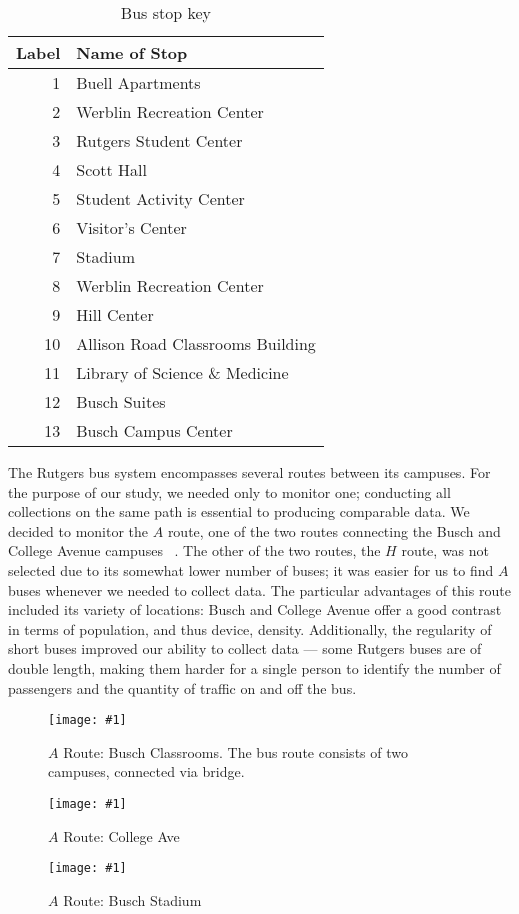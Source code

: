 \documentclass[12pt,journal,compsoc]{IEEEtran} %
\newcommand{\minipic}[3]{
  \begin{figure}[!t]
    \centering
    \texttt{[image: \#1]}
    \caption{#2}
    \label{#3}
  \end{figure}
}
\begin{document}
\begin{table}[!t]
  \centering
  \caption{Bus stop key}
  \begin{tabular}{ rl }
    \toprule
    Label & Name of Stop\\
    \midrule
    1 & Buell Apartments\\
    2 & Werblin Recreation Center\\
    3 & Rutgers Student Center\\
    4 & Scott Hall\\
    5 & Student Activity Center\\
    6 & Visitor's Center\\
    7 & Stadium\\
    8 & Werblin Recreation Center\\
    9 & Hill Center\\
    10 & Allison Road Classrooms Building\\
    11 & Library of Science \& Medicine\\
    12 & Busch Suites\\
    13 & Busch Campus Center\\
    \bottomrule
  \end{tabular}
  \label{tab:stops}
\end{table}

The Rutgers bus system encompasses several routes between its campuses.
For the purpose of our study, we needed only to monitor one; conducting all collections on the same path is essential to producing comparable data.
We decided to monitor the $A$ route, one of the two routes connecting the Busch and College Avenue campuses ~\cite{busroutes}.
The other of the two routes, the $H$ route, was not selected due to its somewhat lower number of buses; it was easier for us to find $A$ buses whenever we needed to collect data.
The particular advantages of this route included its variety of locations: Busch and College Avenue offer a good contrast in terms of population, and thus device, density.
Additionally, the regularity of short buses improved our ability to collect data --- some Rutgers buses are of double length, making them harder for a single person to identify the number of passengers and the quantity of traffic on and off the bus.

\minipic{aroutebusch}{$A$ Route: Busch Classrooms. The bus route consists of two campuses, connected via bridge.} {fig:aroutebusch}
\minipic{aroutecollegeave}{$A$ Route: College Ave}{fig:aroutecollegeave}
\minipic{aroutestadium}{$A$ Route: Busch Stadium}{fig:aroutestadium}
\end{document}
